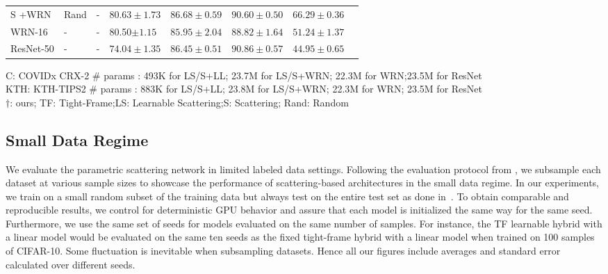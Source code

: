 \documentclass[10pt,twocolumn,letterpaper]{article}
\begin{document}
\begin{table*}[t]
\begin{tabularx}{0.8\linewidth}{llllll|ll}
            S +WRN&Rand &-& $80.63\pm1.73$&$86.68\pm0.59$ & $90.60\pm0.50$ & $66.29\pm0.36$\\
             WRN-16&-&- &80.50$\pm 1.15$ &  $85.95\pm2.04$ & $88.82\pm1.64$ & $51.24\pm1.37$\\
             ResNet-50&-&-& $74.04 \pm1.35$ & $86.45 \pm 0.51$ &$90.86\pm 0.57$ &$44.95\pm 0.65$  \\
            \hline
        \end{tabularx}
\begin{flushleft}
\scriptsize
\vspace{-5pt}
\hspace{55pt}C: COVIDx CRX-2\hspace{5pt} $\#$ params : 493K for LS/S+LL; 23.7M for LS/S+WRN; 22.3M for WRN;23.5M for ResNet\\
\hspace{55pt}KTH: KTH-TIPS2\hspace{5pt} $\#$ params : 883K for LS/S+LL; 23.8M for LS/S+WRN; 22.3M for WRN; 23.5M for ResNet\\
\hspace{55pt}$\dagger$: ours; \hspace{5pt} TF: Tight-Frame;\hspace{5pt}LS: Learnable Scattering;\hspace{5pt}S: Scattering;\hspace{5pt} Rand: Random
\end{flushleft}
\vspace{-20pt}
\end{table*}


\subsection{Small Data Regime}
 \label{sec:smalldata}
 We evaluate the parametric scattering network in limited labeled data settings. Following the evaluation protocol from \cite{oyallon2018replearning}, we subsample each dataset at various sample sizes to showcase the performance of scattering-based architectures in the small data regime.  In our experiments, we train on a small random subset of the training data but always test on the entire test set as done in~\cite{oyallon2018replearning}. To obtain comparable and reproducible results, we control for deterministic GPU behavior and assure that each model is initialized the same way for the same seed. Furthermore, we use the same set of seeds for models evaluated on the same number of samples. For instance, the TF learnable hybrid with a linear model would be evaluated on the same ten seeds as the fixed tight-frame hybrid with a linear model when trained on 100 samples of CIFAR-10. Some fluctuation is inevitable when subsampling datasets. Hence all our figures include averages and standard error calculated over different seeds. 
 \vspace{-10pt}
\end{document}
